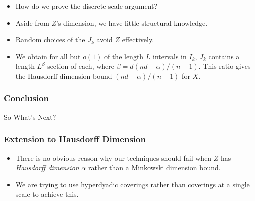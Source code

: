 \documentclass[usenames,dvipsnames]{beamer}
\begin{document}
\begin{frame}
\begin{figure}
    \end{figure}

    \begin{itemize}
        \item How do we prove the discrete scale argument?

        \pause
        \item Aside from $Z$'s dimension, we have little structural knowledge.

        \pause
        \item Random choices of the $J_k$ avoid $Z$ effectively.

        \item We obtain for all but $o(1)$ of the length $L$ intervals in $I_k$, $J_k$ contains a length $L^\beta$ section of each, where $\beta = d(nd - \alpha)/(n - 1)$. This ratio gives the Hausdorff dimension bound $(nd-\alpha)/(n-1)$ for $X$.
    \end{itemize}
\end{frame}

\begin{frame}
    \frametitle{Conclusion}

    {\Huge So What's Next?}
\end{frame}

\begin{frame}
    \frametitle{Extension to Hausdorff Dimension}

    \begin{itemize}
        \item There is no obvious reason why our techniques should fail when $Z$ has {\it Hausdorff dimension} $\alpha$ rather than a Minkowski dimension bound.

        \pause
        \item We are trying to use hyperdyadic coverings rather than coverings at a single scale to achieve this.
    \end{itemize}
\end{frame}
\end{document}
